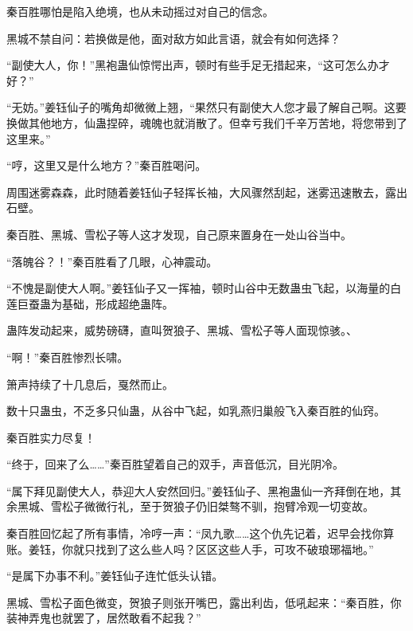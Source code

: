 \begin{this_body}
秦百胜哪怕是陷入绝境，也从未动摇过对自己的信念。

黑城不禁自问：若换做是他，面对敌方如此言语，就会有如何选择？

“副使大人，你！”黑袍蛊仙惊愕出声，顿时有些手足无措起来，“这可怎么办才好？”

“无妨。”姜钰仙子的嘴角却微微上翘，“果然只有副使大人您才最了解自己啊。这要换做其他地方，仙蛊捏碎，魂魄也就消散了。但幸亏我们千辛万苦地，将您带到了这里来。”

“哼，这里又是什么地方？”秦百胜喝问。

周围迷雾森森，此时随着姜钰仙子轻挥长袖，大风骤然刮起，迷雾迅速散去，露出石壁。

秦百胜、黑城、雪松子等人这才发现，自己原来置身在一处山谷当中。

“落魄谷？！”秦百胜看了几眼，心神震动。

“不愧是副使大人啊。”姜钰仙子又一挥袖，顿时山谷中无数蛊虫飞起，以海量的白莲巨蚕蛊为基础，形成超绝蛊阵。

蛊阵发动起来，威势磅礴，直叫贺狼子、黑城、雪松子等人面现惊骇。、

“啊！”秦百胜惨烈长啸。

箫声持续了十几息后，戛然而止。

数十只蛊虫，不乏多只仙蛊，从谷中飞起，如乳燕归巢般飞入秦百胜的仙窍。

秦百胜实力尽复！

“终于，回来了么……”秦百胜望着自己的双手，声音低沉，目光阴冷。

“属下拜见副使大人，恭迎大人安然回归。”姜钰仙子、黑袍蛊仙一齐拜倒在地，其余黑城、雪松子微微行礼，至于贺狼子仍旧桀骜不驯，抱臂冷观一切变故。

秦百胜回忆起了所有事情，冷哼一声：“凤九歌……这个仇先记着，迟早会找你算账。姜钰，你就只找到了这么些人吗？区区这些人手，可攻不破琅琊福地。”

“是属下办事不利。”姜钰仙子连忙低头认错。

黑城、雪松子面色微变，贺狼子则张开嘴巴，露出利齿，低吼起来：“秦百胜，你装神弄鬼也就罢了，居然敢看不起我？”

\end{this_body}

